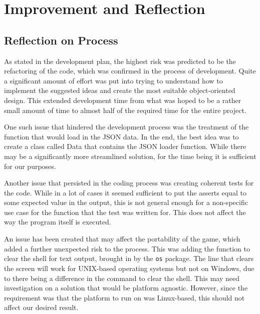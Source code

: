 \documentclass[12pt,a4paper,tightenlines]{article}
\begin{document}
\section{Improvement and Reflection}
\subsection{Reflection on Process}
As stated in the development plan, the highest risk was predicted to be
the refactoring of the code, which was confirmed in the process
of development. Quite a significant amount of effort was put into 
trying to understand how to implement the suggested ideas and create
the most suitable object-oriented design. This extended development time
from what was hoped to be a rather small amount of time to almost
half of the required time for the entire project.

One such issue that hindered
the development process was the treatment of the function that would load
in the JSON data. In the end, the best idea was to create a class called
Data that contains the JSON loader function. While there may be a 
significantly more streamlined solution, for the time being it is
sufficient for our purposes.

Another issue that persisted in the coding process was creating
coherent tests for the code. While in a lot of cases it seemed sufficient
to put the asserts equal to some expected value in the output, this
is not general enough for a non-specific use case for the function
that the test was written for. This does not affect the way the 
program itself is executed.

An issue has been created that may affect the portability of the game,
which added a further unexpected risk to the process. This was adding
the function to clear the shell for text output, brought in by the
\texttt{os} package. The line that clears the screen will work for 
UNIX-based operating systems but not on Windows, due to there being
a difference in the command to clear the shell. This may need 
investigation on a solution that would be platform agnostic. However,
since the requirement was that the platform to run on was Linux-based,
this should not affect our desired result.
\end{document}
